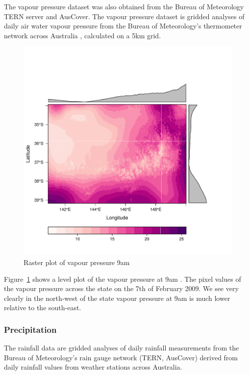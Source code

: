 \documentclass[11pt,a4paper]{article}
\begin{document}
The vapour pressure dataset was also obtained from the Bureau of Meteorology TERN server and AusCover. The vapour pressure dataset is gridded analyses of daily air water vapour pressure from the Bureau of Meteorology's thermometer network across Australia \citep{jones09}, calculated on a 5km grid.

\begin{figure}
  \centering
	\includegraphics[width=1\columnwidth]{figures/vap_ras.pdf}
  \caption{Raster plot of vapour pressure 9am }
  \label{fig:vap_ras}
\end{figure}

Figure~\ref{fig:vap_ras} shows a level plot of the vapour pressure at 9am \citep{rastervis}. The pixel values of the vapour pressure across the state on the 7th of February 2009. We see very clearly in the north-west of the state vapour pressure at 9am is much lower relative to the south-east.


\subsubsection{Precipitation}

The rainfall data are gridded analyses of daily rainfall measurements from the Bureau of Meteorology's rain gauge network (TERN, AusCover) derived from daily rainfall values from weather stations across Australia.
\end{document}

